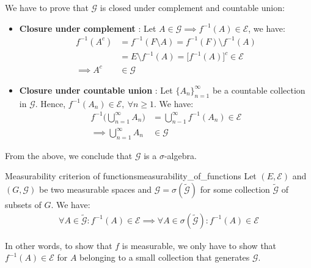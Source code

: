 \begin{proof*}
    We have to prove that $\mathcal{G}$ is closed under complement and countable union:
    \begin{itemize}
        \item \textbf{Closure under complement} : Let $A\in\mathcal{G}\implies f^{-1}(A)\in\mathcal{E}$, we have:
        \begin{align*}
            f^{-1}(A^c) &= f^{-1}(F\setminus A) = f^{-1}(F) \setminus f^{-1}(A) \\
                &= E \setminus f^{-1}(A) = \Big[ f^{-1}(A) \Big]^c \in \mathcal{E} \\
            \implies A^c &\in \mathcal{G}
        \end{align*}

        \item \textbf{Closure under countable union} : Let $\{A_n\}_{n=1}^\infty$ be a countable collection in $\mathcal{G}$. Hence, $f^{-1}(A_n)\in\mathcal{E}, \ \forall n \ge 1$. We have:
        \begin{align*}
            f^{-1}\Bigg( \bigcup_{n=1}^\infty A_n \Bigg) &= \bigcup_{n-1}^\infty f^{-1}(A_n) \in \mathcal{E} \\
            \implies \bigcup_{n=1}^\infty A_n &\in \mathcal{G}
        \end{align*}
    \end{itemize}

    \noindent\newline From the above, we conclude that $\mathcal{G}$ is a $\sigma$-algebra. 
\end{proof*}

\begin{proposition}{Measurability criterion of functions}{measurability_of_functions}
    Let $(E, \mathcal{E})$ and $(G, \mathcal{G})$ be two measurable spaces and $\mathcal{G} = \sigma(\mathcal{\tilde G})$ for some collection $\mathcal{\tilde G}$ of subsets of $G$. We have:
    \begin{align*}
        \forall A \in \mathcal{\tilde G} : f^{-1}(A) \in \mathcal{E} \implies \forall A \in \sigma(\mathcal{\tilde G}) : f^{-1}(A) \in \mathcal{E}
    \end{align*}

    \noindent In other words, to show that $f$ is measurable, we only have to show that $f^{-1}(A)\in\mathcal{E}$ for $A$ belonging to a small collection that generates $\mathcal{G}$.
\end{proposition}


